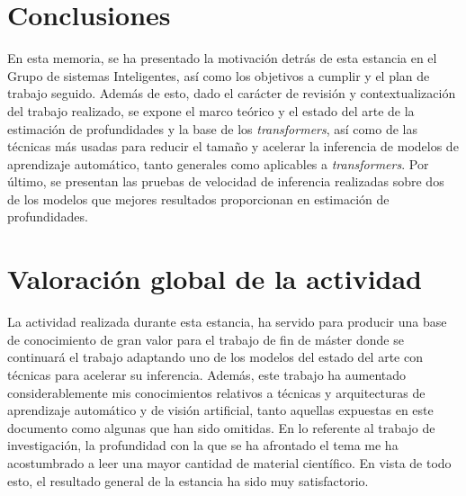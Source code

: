 \documentclass[a4paper, 11pt]{article}
\begin{document}
\section{Conclusiones}
En esta memoria, se ha presentado la motivación detrás de esta estancia en el Grupo de sistemas Inteligentes, así como los objetivos a cumplir y el plan de trabajo seguido. Además de esto, dado el carácter de revisión y contextualización del trabajo realizado, se expone el marco teórico y el estado del arte de la estimación de profundidades y la base de los \textit{transformers}, así como de las técnicas más usadas para reducir el tamaño y acelerar la inferencia de modelos de aprendizaje automático, tanto generales como aplicables a \textit{transformers}. Por último, se presentan las pruebas de velocidad de inferencia realizadas sobre dos de los modelos que mejores resultados proporcionan en estimación de profundidades.

\section{Valoración global de la actividad}
La actividad realizada durante esta estancia, ha servido para producir una base de conocimiento de gran valor para el trabajo de fin de máster donde se continuará el trabajo adaptando uno de los modelos del estado del arte con técnicas para acelerar su inferencia. Además, este trabajo ha aumentado considerablemente mis conocimientos relativos a técnicas y arquitecturas de aprendizaje automático y de visión artificial, tanto aquellas expuestas en este documento como algunas que han sido omitidas. En lo referente al trabajo de investigación, la profundidad con la que se ha afrontado el tema me ha acostumbrado a leer una mayor cantidad de material científico. En vista de todo esto, el resultado general de la estancia ha sido muy satisfactorio.

% 

\clearpage


\clearpage
\appendix
\end{document}
